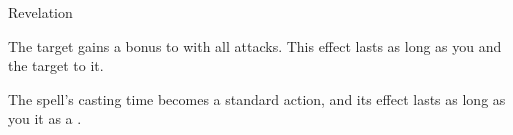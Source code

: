 \begin{spellsection}{Revelation}
\begin{spellheader}
\end{spellheader}
\begin{spellcontent}
\begin{spelltargetinginfo}
\end{spelltargetinginfo}
\begin{spelleffects}
\spelleffect
The target gains a  bonus to  with all attacks.
This effect lasts as long as you and the target  to it.
\end{spelleffects}
\end{spellcontent}
\begin{spellfooter}
\end{spellfooter}
\begin{spellsubcontent}
\begin{spellcantrip}
The spell's casting time becomes a standard action, and its effect lasts as long as you  it as a .
\end{spellcantrip}
\end{spellsubcontent}
\end{spellsection}
